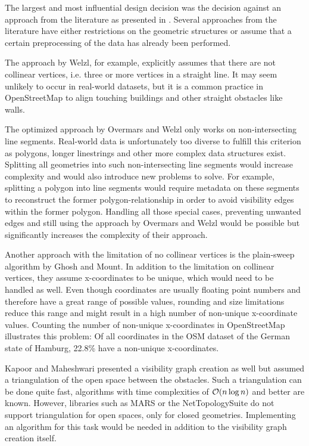 		The largest and most influential design decision was the decision against an approach from the literature as presented in .
		Several approaches from the literature have either restrictions on the geometric structures or assume that a certain preprocessing of the data has already been performed.
		
		The approach by Welzl\cite{welzl-visibility-graph}, for example, explicitly assumes that there are not collinear vertices, i.e. three or more vertices in a straight line.
		It may seem unlikely to occur in real-world datasets, but it is a common practice in OpenStreetMap to align touching buildings and other straight obstacles like walls.
		
		The optimized approach by Overmars and Welzl\cite{overmars-weizl-visibility-graph} only works on non-intersecting line segments.
		Real-world data is unfortunately too diverse to fulfill this criterion as polygons, longer linestrings and other more complex data structures exist.
		Splitting all geometries into such non-intersecting line segments would increase complexity and would also introduce new problems to solve.
		For example, splitting a polygon into line segments would require metadata on these segments to reconstruct the former polygon-relationship in order to avoid visibility edges within the former polygon.
		Handling all those special cases, preventing unwanted edges and still using the approach by Overmars and Welzl would be possible but significantly increases the complexity of their approach.
		
		Another approach with the limitation of no collinear vertices is the plain-sweep algorithm by Ghosh and Mount\cite{ghosh-output-sensitive-vgraph}.
		In addition to the limitation on collinear vertices, they assume x-coordinates to be unique, which would need to be handled as well.
		Even though coordinates are usually floating point numbers and therefore have a great range of possible values, rounding and size limitations reduce this range and might result in a high number of non-unique x-coordinate values.
		Counting the number of non-unique x-coordinates in OpenStreetMap illustrates this problem:
		Of all coordinates in the OSM dataset of the German state of Hamburg, 22.8\% have a non-unique x-coordinates.
		
		Kapoor and Maheshwari presented a visibility graph creation as well\cite{kapoor-shortest-path-vgraph} but assumed a triangulation of the open space between the obstacles.
		Such a triangulation can be done quite fast, algorithms with time complexities of $\mathcal{O}(n \log{n})$ and better are known\cite[58-60]{de-berg-computational-geometry}.
		However, libraries such as MARS or the NetTopologySuite do not support triangulation for open spaces, only for closed geometries.
		Implementing an algorithm for this task would be needed in addition to the visibility graph creation itself.
		
